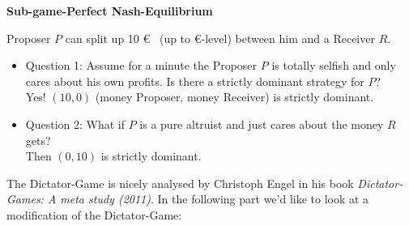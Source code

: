 \textbf{Sub-game-Perfect Nash-Equilibrium}


\begin{example} 
Proposer $P$ can split up 10 \euro ~ (up to \euro-level) between him and a Receiver $R$. 
	\begin{itemize}
		\item Question 1: Assume for a minute the Proposer $P$ is totally selfish and only cares about his own profits. Is there a strictly dominant strategy for $P$? \\
			Yes! $(10, 0)$ (money Proposer, money Receiver) is strictly dominant.
		\item Question 2: What if $P$ is a pure altruist and just cares about the money $R$ gets? \\
			Then $(0, 10)$ is strictly dominant.
	\end{itemize}
\end{example}


The Dictator-Game is nicely analysed by Christoph Engel in his book \textit{Dictator-Games: A meta study (2011)}. In the following part we'd like to look at a modification of the Dictator-Game:

